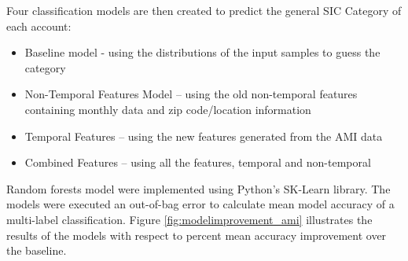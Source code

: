 Four classification models are then created to predict the general SIC Category of each account:
\begin{itemize}
\item Baseline model - using the distributions of the input samples to guess the category
\item Non-Temporal Features Model – using the old non-temporal features containing monthly data and zip code/location information
\item Temporal Features – using the new features generated from the AMI data
\item Combined Features – using all the features, temporal and non-temporal
\end{itemize}

Random forests model were implemented using Python’s SK-Learn library. The models were executed an out-of-bag error to calculate mean model accuracy of a multi-label classification. Figure \ref{fig:modelimprovement_ami} illustrates the results of the models with respect to percent mean accuracy improvement over the baseline.
